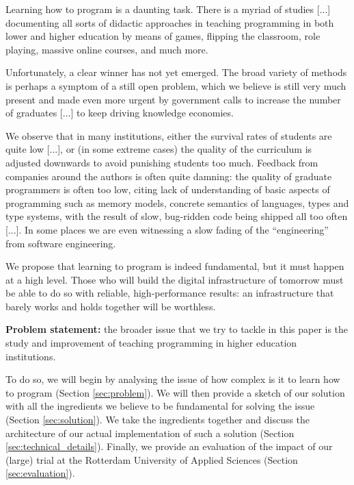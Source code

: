 Learning how to program is a daunting task. There is a myriad of studies [...] documenting all sorts of didactic approaches in teaching programming in both lower and higher education by means of games, flipping the classroom, role playing, massive online courses, and much more.

Unfortunately, a clear winner has not yet emerged. The broad variety of methods is perhaps a symptom of a still open problem, which we believe is still very much present and made even more urgent by government calls to increase the number of graduates [...] to keep driving knowledge economies. 

We observe that in many institutions, either the survival rates of students are quite low [...], or (in some extreme cases) the quality of the curriculum is adjusted downwards to avoid punishing students too much. Feedback from companies around the authors is often quite damning: the quality of graduate programmers is often too low, citing lack of understanding of basic aspects of programming such as memory models, concrete semantics of languages, types and type systems, with the result of slow, bug-ridden code being shipped all too often [...]. In some places we are even witnessing a slow fading of the “engineering” from software engineering. 

We propose that learning to program is indeed fundamental, but it must happen at a high level. Those who will build the digital infrastructure of tomorrow must be able to do so with reliable, high-performance results: an infrastructure that barely works and holds together will be worthless.

\textbf{Problem statement:} the broader issue that we try to tackle in this paper is the study and improvement of teaching programming in higher education institutions. 

To do so, we will begin by analysing the issue of how complex is it to learn how to program (Section \ref{sec:problem}). We will then provide a sketch of our solution with all the ingredients we believe to be fundamental for solving the issue (Section \ref{sec:solution}). We take the ingredients together and discuss the architecture of our actual implementation of such a solution (Section \ref{sec:technical_details}). Finally, we provide an evaluation of the impact of our (large) trial at the Rotterdam University of Applied Sciences (Section \ref{sec:evaluation}).
